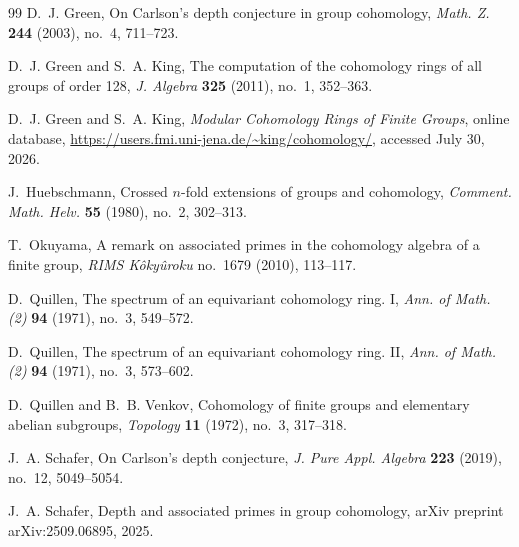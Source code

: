 \documentclass[11pt]{amsart}
\theoremstyle{definition}
\theoremstyle{remark}
\begin{document}
\begin{thebibliography}{99}
D.~J. Green,
On Carlson's depth conjecture in group cohomology,
\emph{Math. Z.} \textbf{244} (2003), no.~4, 711--723.


D.~J. Green and S.~A. King,
The computation of the cohomology rings of all groups of order 128,
\emph{J. Algebra} \textbf{325} (2011), no.~1, 352--363.

D.~J. Green and S.~A. King,
\emph{Modular Cohomology Rings of Finite Groups},
online database,
\url{https://users.fmi.uni-jena.de/~king/cohomology/},
accessed July 30, 2026.

J.~Huebschmann,
Crossed \(n\)-fold extensions of groups and cohomology,
\emph{Comment. Math. Helv.} \textbf{55} (1980), no.~2, 302--313.

T.~Okuyama,
A remark on associated primes in the cohomology algebra of a finite group,
\emph{RIMS K\^oky\^uroku} no.~1679 (2010), 113--117.

D.~Quillen,
The spectrum of an equivariant cohomology ring. I,
\emph{Ann. of Math. (2)} \textbf{94} (1971), no.~3, 549--572.

D.~Quillen,
The spectrum of an equivariant cohomology ring. II,
\emph{Ann. of Math. (2)} \textbf{94} (1971), no.~3, 573--602.

D.~Quillen and B.~B. Venkov,
Cohomology of finite groups and elementary abelian subgroups,
\emph{Topology} \textbf{11} (1972), no.~3, 317--318.

J.~A. Schafer,
On Carlson's depth conjecture,
\emph{J. Pure Appl. Algebra} \textbf{223} (2019), no.~12, 5049--5054.

J.~A. Schafer,
Depth and associated primes in group cohomology,
arXiv preprint arXiv:2509.06895, 2025.

\end{thebibliography}
\end{document}
